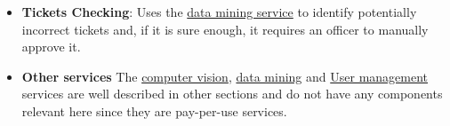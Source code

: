 \begin{itemize}
	\item \textbf{Tickets Checking}: Uses the \hyperlink{discovery}{data mining service} to identify potentially incorrect tickets and, if it is sure enough, it requires an officer to manually approve it.
	
	\item \textbf{Other services}
	The \hyperlink{watson}{computer vision}, \hyperlink{discovery}{data mining} and \hyperlink{appid}{User management} services are well described in other sections and do not have any components relevant here since they are pay-per-use services.
\end{itemize}